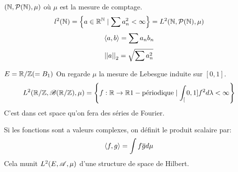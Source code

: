 \begin{example}
	$(\mathbb{N}, \mathcal{P}(\mathbb{N}), \mu)$ où $\mu$ est la mesure de comptage.
	$$l^2(\mathbb{N}) = \left\{ a \in \mathbb{R}^{\mathbb{N}} \mid \sum a_n^2 < \infty\right\} = L^2(\mathbb{N}, \mathcal{P}(\mathbb{N}), \mu)$$
	$$\left\langle a, b \right\rangle = \sum a_n b_n$$
	$$\left|\left|a\right|\right|_2 = \sqrt{\sum a_n^2}$$
\end{example}

\begin{example}
	$ E = \mathbb{R}/\mathbb{Z} ( = B_1)$
	On regarde $\mu$ la mesure de Lebesgue induite sur $[0,1]$.
	$$ L^2(\mathbb{R}/\mathbb{Z}, \mathscr{B} (\mathbb{R}/\mathbb{Z}), \mu) = \left\{ f: \mathbb{R} \to \mathbb{R} 1- \text{périodique} \mid \int_[0,1] f^2 d\lambda < \infty \right\} $$
	C'est dans cet space qu'on fera des séries de Fourier.
\end{example}

\begin{remarque}
	Si les fonctions sont a valeurs complexes, on définit le produit scalaire par:
	$$\left\langle f, g \right\rangle = \int f \overline{g} d \mu$$
	Cela munit $L^2(E, \mathscr{A}, \mu)$ d'une structure de space de Hilbert.
\end{remarque}
